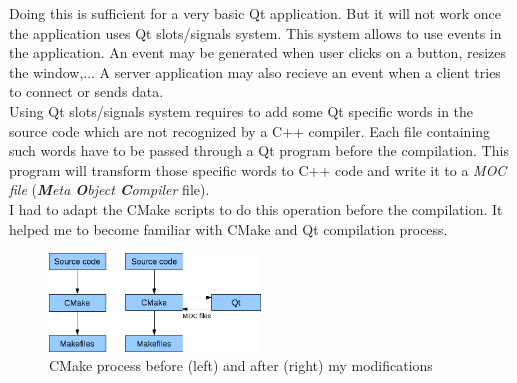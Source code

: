 Doing this is sufficient for a very basic Qt application. But it will not work
once the application uses Qt slots/signals system. This system allows to use
events in the application. An event may be generated when user clicks on a
button, resizes the window,... A server application may also recieve an event
when a client tries to connect or sends data.\\

Using Qt slots/signals system requires to add some Qt specific words in the
source code which are not recognized by a C++ compiler. Each file containing
such words have to be passed through a Qt program before the compilation. This
program will transform those specific words to C++ code and write it to a
\textit{MOC file} (\textit{\textbf{M}eta \textbf{O}bject \textbf{C}ompiler}
file).\\

I had to adapt the CMake scripts to do this operation before the compilation.
It helped me to become familiar with CMake and Qt compilation process.

\begin{figure}[H]
 \begin{center}
  \includegraphics[width=0.5\textwidth]{images/cmake}
 \end{center}
\caption{CMake process before (left) and after (right) my modifications}
\end{figure}
